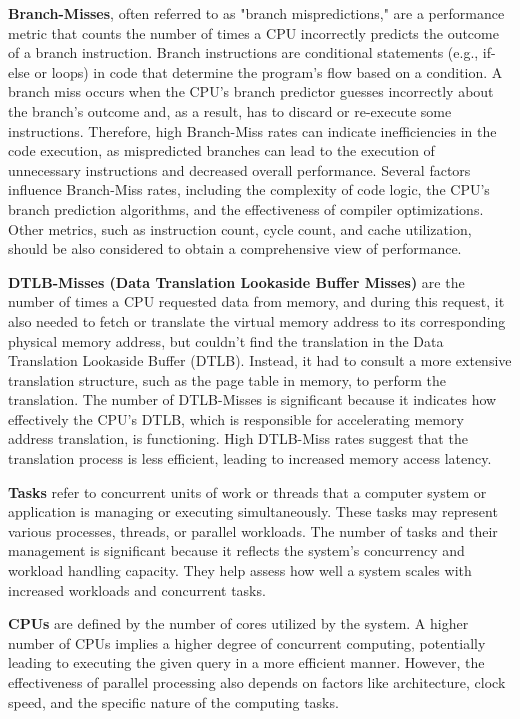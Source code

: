\textbf{Branch-Misses}, often referred to as "branch mispredictions," are a performance metric that counts the number of times a CPU incorrectly predicts the outcome of a branch instruction. Branch instructions are conditional statements (e.g., if-else or loops) in code that determine the program's flow based on a condition. A branch miss occurs when the CPU's branch predictor guesses incorrectly about the branch's outcome and, as a result, has to discard or re-execute some instructions. Therefore, high Branch-Miss rates can indicate inefficiencies in the code execution, as mispredicted branches can lead to the execution of unnecessary instructions and decreased overall performance. Several factors influence Branch-Miss rates, including the complexity of code logic, the CPU's branch prediction algorithms, and the effectiveness of compiler optimizations. Other metrics, such as instruction count, cycle count, and cache utilization, should be also considered to obtain a comprehensive view of performance.

\textbf{DTLB-Misses (Data Translation Lookaside Buffer Misses)} are the number of times a CPU requested data from memory, and during this request, it also needed to fetch or translate the virtual memory address to its corresponding physical memory address, but couldn't find the translation in the Data Translation Lookaside Buffer (DTLB). Instead, it had to consult a more extensive translation structure, such as the page table in memory, to perform the translation. The number of DTLB-Misses is significant because it indicates how effectively the CPU's DTLB, which is responsible for accelerating memory address translation, is functioning. High DTLB-Miss rates suggest that the translation process is less efficient, leading to increased memory access latency.

\textbf{Tasks} refer to concurrent units of work or threads that a computer system or application is managing or executing simultaneously. These tasks may represent various processes, threads, or parallel workloads. The number of tasks and their management is significant because it reflects the system's concurrency and workload handling capacity. They help assess how well a system scales with increased workloads and concurrent tasks.

\textbf{CPUs} are defined by the number of cores utilized by the system. A higher number of CPUs implies a higher degree of concurrent computing, potentially leading to executing the given query in a more efficient manner. However, the effectiveness of parallel processing also depends on factors like architecture, clock speed, and the specific nature of the computing tasks.

